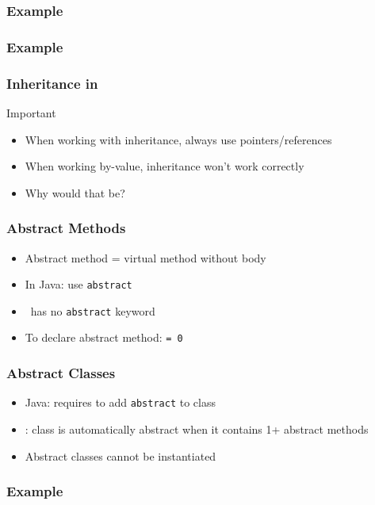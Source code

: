 \begin{frame}
  \frametitle{Example}
\end{frame}

\begin{frame}
  \frametitle{Example}
\end{frame}

\begin{frame}
  \frametitle{Inheritance in \cpp}
  \begin{center} \Large
    \alert{Important}
  \end{center}
  \begin{itemize}
    \item When working with inheritance, always use pointers/references
    \item When working by-value, inheritance won't work correctly
    \item Why would that be? \cake
  \end{itemize}
\end{frame}

\begin{frame}
  \frametitle{Abstract Methods}
  \begin{itemize}
    \item Abstract method = virtual method without body
    \item In Java: use {\tt abstract}
    \item \cpp\ has no {\tt abstract} keyword
    \item To declare abstract method: {\tt = 0}
  \end{itemize}
  \vskip5mm
\end{frame}

\begin{frame}
  \frametitle{Abstract Classes}
  \begin{itemize}
    \item Java: requires to add {\tt abstract} to class
    \item \cpp: class is automatically abstract when it contains 1+ abstract methods
    \item Abstract classes cannot be instantiated
  \end{itemize}
\end{frame}

\begin{frame}
  \frametitle{Example}
\end{frame}

